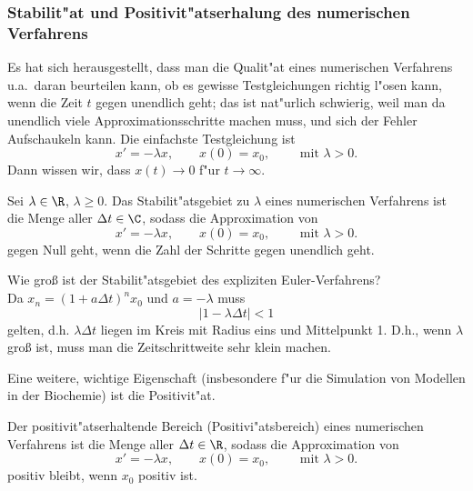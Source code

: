 \subsubsection{Stabilit"at und Positivit"atserhalung 
des numerischen Verfahrens}\par
{}
Es hat sich herausgestellt, dass man die Qualit"at eines numerischen Verfahrens
u.a.\ daran beurteilen kann, ob es gewisse Testgleichungen richtig 
l"osen kann, wenn die Zeit $t$ gegen unendlich geht; das ist nat"urlich schwierig, weil man da unendlich viele Approximationsschritte machen muss, und
sich der Fehler Aufschaukeln kann. Die einfachste Testgleichung ist
$$ x' = -\lambda x,\qquad x(0)=x_0,\qquad\mbox{ mit } \lambda>0.$$
Dann wissen wir, dass $x(t)\rightarrow 0$ f"ur $t\rightarrow\infty$. 
\begin{sdefi}
Sei $\lambda\in\R$, $\lambda\geq 0$. 
Das Stabilit"atsgebiet zu $\lambda$ 
eines numerischen Verfahrens ist die Menge aller 
$\Delta t\in\C$,  sodass die Approximation von 
$$ x' = -\lambda x,\qquad x(0)=x_0,\qquad\mbox{ mit } \lambda>0.$$
gegen Null geht, wenn die Zahl der Schritte gegen unendlich geht.
\end{sdefi}
\begin{bspX}
Wie gro\ss{} ist der Stabilit"atsgebiet des expliziten Euler-Verfahrens?\\
Da  $x_n =(1+a\Delta t)^n x_0$ und $a=-\lambda$ muss
$$ |1-\lambda\Delta t |<1$$
gelten, d.h.  $\lambda\Delta t$ liegen im Kreis mit Radius eins und Mittelpunkt 1.
D.h., wenn $\lambda$ gro\ss{} ist, muss man die Zeitschrittweite 
sehr klein machen.
\end{bspX}
Eine weitere, wichtige Eigenschaft (insbesondere f"ur die Simulation von Modellen 
in der Biochemie) ist die Positivit"at.
\begin{sdefi}
Der positivit"atserhaltende Bereich (Positivi"atsbereich) 
eines numerischen Verfahrens ist die Menge aller 
$\Delta t\in\R$,  sodass die Approximation von 
$$ x' = -\lambda x,\qquad x(0)=x_0,\qquad\mbox{ mit } \lambda>0.$$
positiv bleibt, wenn $x_0$ positiv ist.
\end{sdefi}
